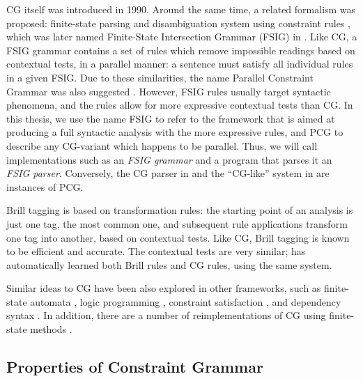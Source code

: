 CG itself was introduced in 1990. Around the same time, a related formalism was proposed: 
finite-state parsing and disambiguation system using constraint rules \cite{koskenniemi90}, which was later named Finite-State Intersection Grammar (FSIG) in \cite{piitulainen1995}. 
Like CG, a FSIG grammar contains a set of rules which remove impossible readings based on contextual tests, 
in a parallel manner: a sentence must satisfy all individual rules in a given FSIG. 
Due to these similarities, the name Parallel Constraint Grammar was also suggested \cite{koskenniemi97}.
However, FSIG rules usually target syntactic phenomena, and the rules allow for more expressive contextual tests than CG. 
In this thesis, we use the name FSIG to refer to the framework that is aimed at producing a full syntactic analysis with the more expressive rules, 
and PCG to describe any CG-variant which happens to be parallel.
Thus, we will call implementations such as \cite{voutilainen1994designing} an \emph{FSIG grammar} and a program that parses it an \emph{FSIG parser}.
Conversely, the CG parser in \cite{listenmaa_claessen2015} 
and the ``CG-like'' system in \cite{lager98} are instances of PCG.

Brill tagging \cite{brill1995} is based on transformation rules: the starting point of 
an analysis is just one tag, the most common one, and subsequent rule applications transform 
one tag into another, based on contextual tests. 
Like CG, Brill tagging is known to be efficient and accurate. The contextual tests are very similar; \cite{lager01transformation} 
has automatically learned both Brill rules and CG rules, using the same system.

Similar ideas to CG have been also explored in other frameworks, such as finite-state automata \cite{gross1997local,grana2003fst},
logic programming \cite{oflazer97votingconstraints,lager98}, 
constraint satisfaction \cite{padro1996csp}, 
and dependency syntax \cite{tapanainen97fdg}. 
 In addition, there are a number of reimplementations of CG using finite-state methods \cite{yli-jyra2011cg_engine,hulden2011cg_engine,peltonen2011}. 

\subsection{Properties of Constraint Grammar}\label{sec:properties}

